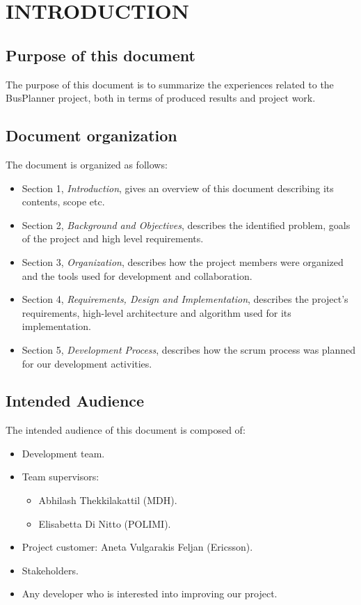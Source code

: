 \section{INTRODUCTION} 
\subsection{Purpose of this document}
The purpose of this document is to summarize the experiences related to the BusPlanner project, both in terms of produced results and project work.

\subsection{Document organization}
The document is organized as follows:
\begin{itemize}
	\item Section 1, \textit{Introduction}, gives an overview of this document describing its contents, scope etc.
	\item Section 2, \textit{Background and Objectives}, describes the identified problem, goals of the project and high level requirements.
	\item Section 3, \textit{Organization}, describes how the project members were organized and the tools used for development and collaboration.
	\item Section 4, \textit{Requirements, Design and Implementation}, describes the project's requirements, high-level architecture and algorithm used for its implementation.
	\item Section 5, \textit{Development Process}, describes how the scrum process was planned for our development activities.
\end{itemize}

\subsection{Intended Audience}
The intended audience of this document is composed of:
\begin{itemize}
	\item Development team.
	\item Team supervisors:
	\begin{itemize}
		\item Abhilash Thekkilakattil (MDH).
		\item Elisabetta Di Nitto (POLIMI).
	\end{itemize}
	\item Project customer: Aneta Vulgarakis Feljan (Ericsson).
	\item Stakeholders.
	\item Any developer who is interested into improving our project.
\end{itemize}

